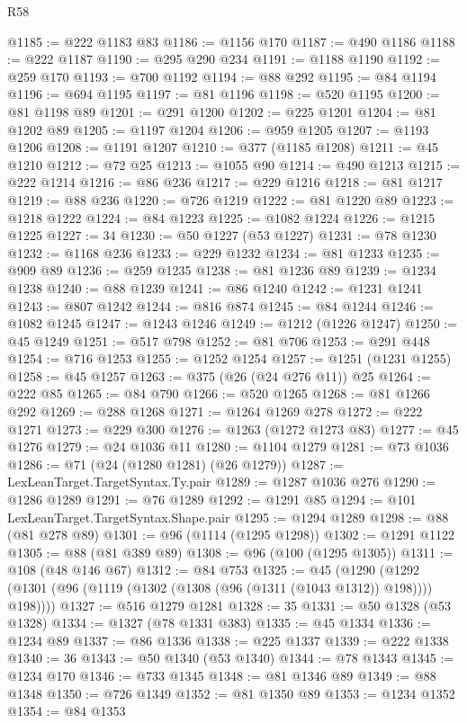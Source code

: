 \begin{lexlean}{R58}
\begin{coremodule}
@1185 := @222 @1183 @83
@1186 := @1156 @170
@1187 := @490 @1186
@1188 := @222 @1187
@1190 := @295 @290 @234
@1191 := @1188 @1190
@1192 := @259 @170
@1193 := @700 @1192
@1194 := @88 @292
@1195 := @84 @1194
@1196 := @694 @1195
@1197 := @81 @1196
@1198 := @520 @1195
@1200 := @81 @1198 @89
@1201 := @291 @1200
@1202 := @225 @1201
@1204 := @81 @1202 @89
@1205 := @1197 @1204
@1206 := @959 @1205
@1207 := @1193 @1206
@1208 := @1191 @1207
@1210 := @377 (@1185 @1208)
@1211 := @45 @1210
@1212 := @72 @25
@1213 := @1055 @90
@1214 := @490 @1213
@1215 := @222 @1214
@1216 := @86 @236
@1217 := @229 @1216
@1218 := @81 @1217
@1219 := @88 @236
@1220 := @726 @1219
@1222 := @81 @1220 @89
@1223 := @1218 @1222
@1224 := @84 @1223
@1225 := @1082 @1224
@1226 := @1215 @1225
@1227 := 34
@1230 := @50 @1227 (@53 @1227)
@1231 := @78 @1230
@1232 := @1168 @236
@1233 := @229 @1232
@1234 := @81 @1233
@1235 := @909 @89
@1236 := @259 @1235
@1238 := @81 @1236 @89
@1239 := @1234 @1238
@1240 := @88 @1239
@1241 := @86 @1240
@1242 := @1231 @1241
@1243 := @807 @1242
@1244 := @816 @874
@1245 := @84 @1244
@1246 := @1082 @1245
@1247 := @1243 @1246
@1249 := @1212 (@1226 @1247)
@1250 := @45 @1249
@1251 := @517 @798
@1252 := @81 @706
@1253 := @291 @448
@1254 := @716 @1253
@1255 := @1252 @1254
@1257 := @1251 (@1231 @1255)
@1258 := @45 @1257
@1263 := @375 (@26 (@24 @276 @11)) @25
@1264 := @222 @85
@1265 := @84 @790
@1266 := @520 @1265
@1268 := @81 @1266 @292
@1269 := @288 @1268
@1271 := @1264 @1269 @278
@1272 := @222 @1271
@1273 := @229 @300
@1276 := @1263 (@1272 @1273 @83)
@1277 := @45 @1276
@1279 := @24 @1036 @11
@1280 := @1104 @1279
@1281 := @73 @1036
@1286 := @71 (@24 (@1280 @1281) (@26 @1279))
@1287 := LexLeanTarget.TargetSyntax.Ty.pair
@1289 := @1287 @1036 @276
@1290 := @1286 @1289
@1291 := @76 @1289
@1292 := @1291 @85
@1294 := @101 LexLeanTarget.TargetSyntax.Shape.pair
@1295 := @1294 @1289
@1298 := @88 (@81 @278 @89)
@1301 := @96 (@1114 (@1295 @1298))
@1302 := @1291 @1122
@1305 := @88 (@81 @389 @89)
@1308 := @96 (@100 (@1295 @1305))
@1311 := @108 (@48 @146 @67)
@1312 := @84 @753
@1325 := @45
    (@1290 (@1292 (@1301 (@96 (@1119 (@1302 (@1308 (@96 (@1311 (@1043 @1312)) @198)))) @198))))
@1327 := @516 @1279 @1281
@1328 := 35
@1331 := @50 @1328 (@53 @1328)
@1334 := @1327 (@78 @1331 @383)
@1335 := @45 @1334
@1336 := @1234 @89
@1337 := @86 @1336
@1338 := @225 @1337
@1339 := @222 @1338
@1340 := 36
@1343 := @50 @1340 (@53 @1340)
@1344 := @78 @1343
@1345 := @1234 @170
@1346 := @733 @1345
@1348 := @81 @1346 @89
@1349 := @88 @1348
@1350 := @726 @1349
@1352 := @81 @1350 @89
@1353 := @1234 @1352
@1354 := @84 @1353

\end{coremodule}
\end{lexlean}
